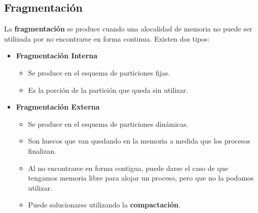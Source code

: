 \subsection{Fragmentación}
La \textbf{fragmentación} se produce cuando una alocalidad de memoria no puede ser utilizada por no encontrarse en forma continua.
Existen dos tipos:
\begin{itemize}
    \item \textbf{Fragmentación Interna}
    \begin{itemize}
        \item Se produce en el esquema de particiones fijas.
        \item Es la porción de la partición que queda sin utilizar.
    \end{itemize}
    \item \textbf{Fragmentación Externa}
    \begin{itemize}
        \item Se produce en el esquema de particiones dinámicas.
        \item Son huecos que van quedando en la memoria a medida que los procesos finalizan.
        \item Al no encontrarse en forma contigua, puede darse el caso de que tengamos memoria libre para alojar un proceso, pero que no la podamos utilizar.
        \item Puede solucionarse utilizando la \textbf{compactación}.
    \end{itemize}
\end{itemize}

